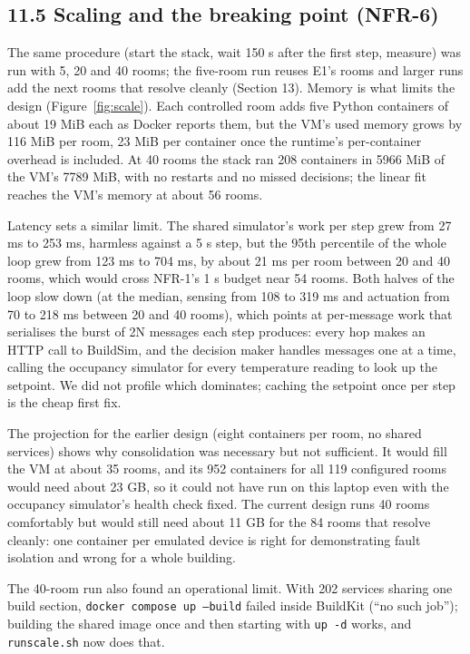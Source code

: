 \documentclass[11pt]{article}
\makeatletter
\DeclareRobustCommand{\_}{\ifmmode\nfss@text{\textunderscore}\else\textunderscore\allowbreak\fi}
\newcommand{\file}[1]{\texttt{#1}}
\makeatother
\begin{document}
\subsection{11.5 Scaling and the breaking point (NFR-6)}

The same procedure (start the stack, wait 150 s after the first step,
measure) was run with 5, 20 and 40 rooms; the five-room run reuses E1's rooms and
larger runs add the next rooms that resolve cleanly (Section 13). Memory is what
limits the design (Figure~\ref{fig:scale}). Each controlled room adds five
Python containers of about 19 MiB each as Docker reports them, but the VM's used
memory grows by 116 MiB per room, 23 MiB per container once
the runtime's per-container overhead is included. At 40 rooms the stack ran 208
containers in 5966 MiB of the VM's 7789 MiB, with no
restarts and no missed decisions; the linear fit reaches the VM's memory at about
56 rooms.

Latency sets a similar limit. The shared simulator's work per step grew from
27 ms to 253 ms, harmless
against a 5 s step, but the 95th percentile of the whole loop grew from
123 ms to 704 ms, by about 21 ms per
room between 20 and 40 rooms, which would cross NFR-1's 1 s budget near
54 rooms. Both halves of the loop slow down (at the median, sensing from
108 to 319 ms and actuation from 70 to 218 ms between 20 and 40 rooms), which
points at per-message work that serialises the burst of 2N messages each step
produces: every hop makes an HTTP call to BuildSim, and the decision maker handles
messages one at a time, calling the occupancy simulator for every temperature
reading to look up the setpoint. We did not profile which dominates; caching the
setpoint once per step is the cheap first fix.

The projection for the earlier design (eight containers per room, no shared
services) shows why consolidation was necessary but not sufficient. It would fill
the VM at about 35 rooms, and its 952 containers for all 119 configured
rooms would need about 23 GB, so it could not have run on this laptop even
with the occupancy simulator's health check fixed. The current design runs 40
rooms comfortably but would still need about 11 GB for the 84 rooms that
resolve cleanly: one container per emulated device is right for demonstrating
fault isolation and wrong for a whole building.

The 40-room run also found an operational limit. With 202 services sharing one
build section, \texttt{docker compose up --build} failed inside BuildKit (``no such
job''); building the shared image once and then starting with \texttt{up -d}
works, and \file{run\_scale.sh} now does that.
\end{document}
